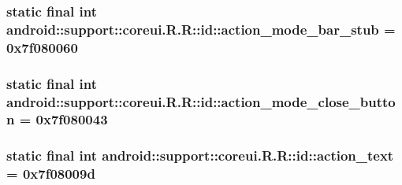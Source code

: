 \hypertarget{classandroid_1_1support_1_1coreui_1_1_r_1_1id_f1f710e54e9458411a2b93b0ff20410b}{
\subsubsection[{action\_\-mode\_\-bar\_\-stub}]{\setlength{\rightskip}{0pt plus 5cm}static final int android::support::coreui.R.R::id::action\_\-mode\_\-bar\_\-stub = 0x7f080060}}
\label{classandroid_1_1support_1_1coreui_1_1_r_1_1id_f1f710e54e9458411a2b93b0ff20410b}


\hypertarget{classandroid_1_1support_1_1coreui_1_1_r_1_1id_15af4dc8f5132c4c4ea0a2b6ed219fb4}{
\subsubsection[{action\_\-mode\_\-close\_\-button}]{\setlength{\rightskip}{0pt plus 5cm}static final int android::support::coreui.R.R::id::action\_\-mode\_\-close\_\-button = 0x7f080043}}
\label{classandroid_1_1support_1_1coreui_1_1_r_1_1id_15af4dc8f5132c4c4ea0a2b6ed219fb4}


\hypertarget{classandroid_1_1support_1_1coreui_1_1_r_1_1id_52aea681c772c75e153aa6712783d6f1}{
\subsubsection[{action\_\-text}]{\setlength{\rightskip}{0pt plus 5cm}static final int android::support::coreui.R.R::id::action\_\-text = 0x7f08009d}}
\label{classandroid_1_1support_1_1coreui_1_1_r_1_1id_52aea681c772c75e153aa6712783d6f1}


